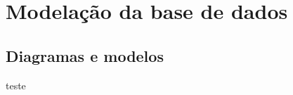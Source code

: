 \section{Modelação da base de dados} \label{section: Modelacao}

\subsection{Diagramas e modelos}
teste